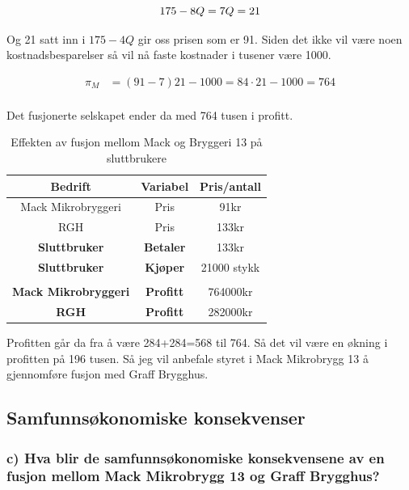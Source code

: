 \documentclass[
  12pt,
  a4paper,
  DIV=11,
  numbers=noendperiod]{scrartcl}
\begin{document}
\[
175-8Q = 7 \\
Q = 21
\]

Og 21 satt inn i \(175-4Q\) gir oss prisen som er 91. Siden det ikke vil
være noen kostnadsbesparelser så vil nå faste kostnader i tusener være
1000.

\begin{align*}
\pi_{M} &= (91-7)21 - 1000 = 84 \cdot 21 - 1000 = 764 \\
\end{align*}

Det fusjonerte selskapet ender da med 764 tusen i profitt.

\begin{table}[h]
\centering
\begin{tabular}{|c|c|c|}
\hline
\textbf{Bedrift} & \textbf{Variabel} & \textbf{Pris/antall} \\ \hline
Mack Mikrobryggeri & Pris & 91kr \\ \hline
RGH & Pris & 133kr \\ \hline
\rowcolor{cornflowerblue} \textbf{Sluttbruker} & \textbf{Betaler} & 133kr \\ \hline
\rowcolor{cornflowerblue} \textbf{Sluttbruker} & \textbf{Kjøper} & 21000 stykk \\ \hline \\ \hline
\rowcolor{lighterblue} \textbf{Mack Mikrobryggeri} & \textbf{Profitt} & 764000kr \\ \hline
\rowcolor{lighterblue} \textbf{RGH} & \textbf{Profitt} & 282000kr \\ \hline
\end{tabular}
\caption{Effekten av fusjon mellom Mack og Bryggeri 13 på sluttbrukere}
\label{table:5}
\end{table}

Profitten går da fra å være 284+284=568 til 764. Så det vil være en
økning i profitten på 196 tusen. Så jeg vil anbefale styret i Mack
Mikrobrygg 13 å gjennomføre fusjon med Graff Brygghus.

\clearpage

\subsection{Samfunnsøkonomiske
konsekvenser}\label{samfunnsuxf8konomiske-konsekvenser}

\subsubsection{c) Hva blir de samfunnsøkonomiske konsekvensene av en
fusjon mellom Mack Mikrobrygg 13 og Graff
Brygghus?}\label{c-hva-blir-de-samfunnsuxf8konomiske-konsekvensene-av-en-fusjon-mellom-mack-mikrobrygg-13-og-graff-brygghus}
\end{document}

